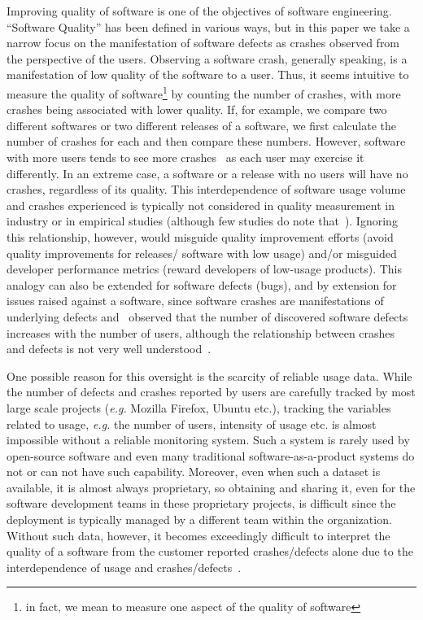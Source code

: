 \documentclass[smallextended]{svjour3}       %
\begin{document}
Improving quality of software is one of the objectives of software
engineering.  ``Software Quality'' has been defined in various ways,
but in this paper we take a narrow focus on the manifestation of software
defects as crashes observed from the perspective of the
users. Observing a software crash, generally speaking, is a
manifestation of low quality of the software to a user. 
Thus, it seems intuitive to measure the quality of software\footnote{in fact, we
  mean to measure one aspect of the quality of software}
by counting the number of crashes, with more crashes being associated
with lower quality. If, for example, we compare 
two different softwares or two different releases of a software,
we first calculate the number of crashes for each and then compare
these numbers. However, software with more users tends
to see more crashes~\cite{dey2018modeling,hmps15,IQ08} as each user
may exercise it differently. In
an extreme case, a software or a release with no users will have
no crashes, regardless of its quality. This interdependence of
software usage volume and crashes experienced is typically not
considered in quality measurement in industry or in empirical studies (although few studies
do note that~\cite{fenton2008using,fenton1999critique}).
Ignoring this relationship, however, would misguide quality
improvement efforts (avoid quality improvements for releases/
software with low usage) and/or misguided developer
performance metrics (reward developers of low-usage products). 
This analogy can also be extended for software
defects (bugs), and by extension for issues raised against a
software, since software crashes are manifestations of underlying
defects and~\cite{caper,hmps15} observed that the number of
discovered software defects increases with the number of users,
although the relationship between crashes and defects is not very
well understood~\cite{fenton1999critique}.  

One possible reason for this oversight is the scarcity of reliable usage data. While the number of defects and crashes reported by users are carefully tracked by most large scale projects (\textit{e.g.} Mozilla Firefox, Ubuntu etc.), tracking the variables related to usage, \textit{e.g.} the number of users, intensity of usage etc. is almost impossible without a reliable monitoring system. Such a system is rarely used by open-source software and even many traditional software-as-a-product systems do not or can not have such capability. Moreover, even when such a dataset is available, it is almost always proprietary, so obtaining and sharing it, even for the software development teams in these proprietary projects, is difficult since the deployment is typically managed by a different team within the organization. Without such data, however, it becomes exceedingly difficult to interpret the quality of a software from the customer reported crashes/defects alone due to the interdependence of usage and crashes/defects~\cite{dey2018modeling,hmps15,IQ08}.
\end{document}
